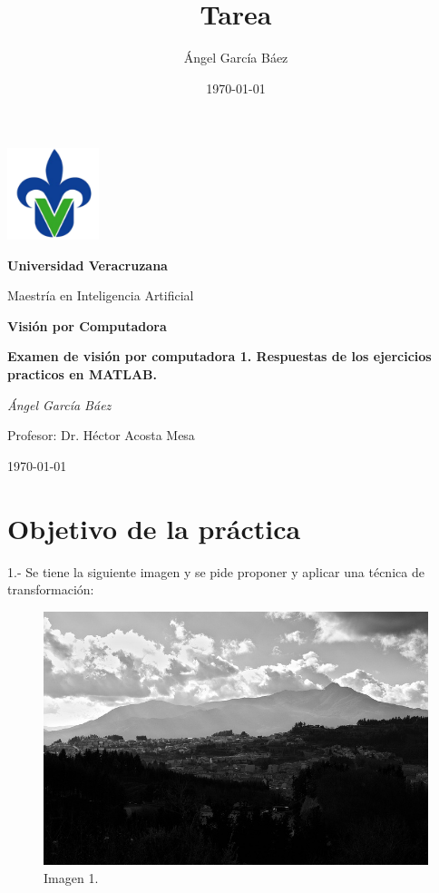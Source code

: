 \documentclass[11pt, letterpaper]{article}
\title{\bfseries Tarea}
\author{Ángel García Báez}
\date{\today}
\begin{document}
	
	\begin{titlepage}
		\centering
		\includegraphics[width=0.2\textwidth]{logo.png}\par
		\vspace{1cm}
		{\LARGE \bfseries Universidad Veracruzana \par}
		\vspace{1cm}
		{\Large Maestría en Inteligencia Artificial\par}
		\vspace{3cm}
		{\LARGE \bfseries Visión por Computadora \par}
		\vspace{1cm}
		{\Large \bfseries Examen de visión por computadora 1. Respuestas de los ejercicios practicos en MATLAB. \par}
		\vfill
		{\Large \textit{Ángel García Báez}\par}
		\vspace{1cm}
		{\Large Profesor: Dr. Héctor Acosta Mesa\par}
		\vfill
		{\Large \today \par}
	\end{titlepage}
	
	\newpage
	\tableofcontents
	\newpage
	
\section{Objetivo de la práctica}

1.- Se tiene la siguiente imagen y se pide proponer y aplicar una técnica de transformación:

\begin{figure}[h!]
	\centering
	\begin{minipage}{0.8\textwidth}
		\centering
		\includegraphics[width=\textwidth]{Imagen1.png}
		\caption{Imagen 1.}
		\label{fig:Imagen 1}
	\end{minipage}\hfill
\end{figure}
\end{document}

